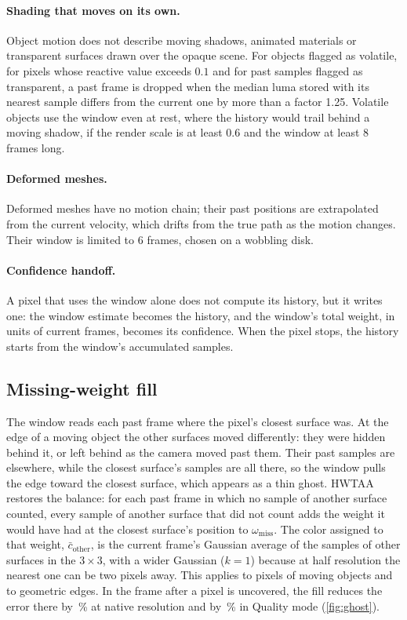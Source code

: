 \documentclass[11pt,a4paper]{article}
\begin{document}
\paragraph{Shading that moves on its own.} Object motion does not describe moving shadows, animated materials or transparent surfaces drawn over the opaque scene. For objects flagged as volatile, for pixels whose reactive value exceeds $0.1$ and for past samples flagged as transparent, a past frame is dropped when the median luma stored with its nearest sample differs from the current one by more than a factor 1.25. Volatile objects use the window even at rest, where the history would trail behind a moving shadow, if the render scale is at least 0.6 and the window at least 8 frames long.

\paragraph{Deformed meshes.} Deformed meshes have no motion chain; their past positions are extrapolated from the current velocity, which drifts from the true path as the motion changes. Their window is limited to 6 frames, chosen on a wobbling disk.

\paragraph{Confidence handoff.} A pixel that uses the window alone does not compute its history, but it writes one: the window estimate becomes the history, and the window's total weight, in units of current frames, becomes its confidence. When the pixel stops, the history starts from the window's accumulated samples.

\subsection{Missing-weight fill}
\label{sec:missing}

The window reads each past frame where the pixel's closest surface was. At the edge of a moving object the other surfaces moved differently: they were hidden behind it, or left behind as the camera moved past them. Their past samples are elsewhere, while the closest surface's samples are all there, so the window pulls the edge toward the closest surface, which appears as a thin ghost. HWTAA restores the balance: for each past frame in which no sample of another surface counted, every sample of another surface that did not count adds the weight it would have had at the closest surface's position to $\omega_{\mathrm{miss}}$. The color assigned to that weight, $\bar c_{\mathrm{other}}$, is the current frame's Gaussian average of the samples of other surfaces in the $3\times3$, with a wider Gaussian ($k=1$) because at half resolution the nearest one can be two pixels away. This applies to pixels of moving objects and to geometric edges. In the frame after a pixel is uncovered, the fill reduces the error there by \nGhostCutNat\,\% at native resolution and by \nGhostCutQ\,\% in Quality mode (\cref{fig:ghost}).
\end{document}
